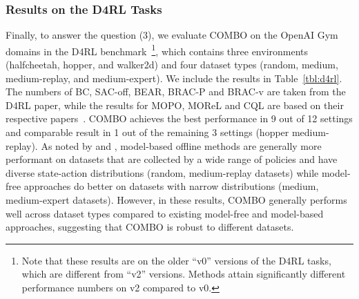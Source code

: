\vspace{-0.2cm}
\subsubsection{Results on the D4RL Tasks}
\label{sec:d4rl_exps}
\vspace{-0.2cm}

{Finally, to answer the question (3)}, we evaluate COMBO on the OpenAI Gym~\citep{brockman2016openai} domains in the D4RL benchmark~\citep{fu2020d4rl}\footnote{Note that these results are on the older ``v0'' versions of the D4RL tasks, which are different from ``v2'' versions. Methods attain significantly different performance numbers on v2 compared to v0.}, which contains three environments (halfcheetah, hopper, and walker2d) and four dataset types (random, medium, medium-replay, and medium-expert). We include the results in Table~\ref{tbl:d4rl}. The numbers of BC, SAC-off, BEAR, BRAC-P and BRAC-v are taken from the D4RL paper, while the results for MOPO, {MOReL} and CQL are based on their respective papers~\citep{yu2020mopo,kumar2020conservative}. 
{COMBO achieves the best performance in 9 out of 12 settings and comparable result in 1 out of the remaining 3 settings (hopper medium-replay).}
As noted by \citet{yu2020mopo} and \citet{Rafailov2020LOMPO}, model-based offline methods are generally more performant on datasets that are collected by a wide range of policies and have diverse state-action distributions (random, medium-replay datasets)
while model-free approaches do better on datasets with narrow distributions (medium, medium-expert datasets). However, in these results, {COMBO generally performs well across dataset types compared to existing model-free and model-based approaches, suggesting that COMBO is robust to different datasets.} 
